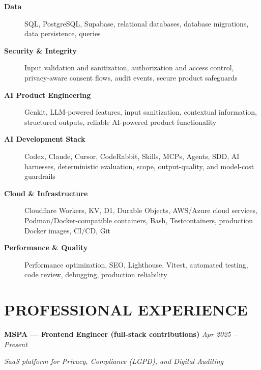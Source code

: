 \documentclass[10pt,a4paper]{article}
\begin{document}
\begin{description}
    \item[\textbf{Data}]
    SQL, PostgreSQL, Supabase, relational databases,
    database migrations, data persistence, queries

    \item[\textbf{Security \& Integrity}]
    Input validation and sanitization, authorization and access control,
    privacy-aware consent flows, audit events, secure product safeguards

    \item[\textbf{AI Product Engineering}]
    Genkit, LLM-powered features, input sanitization,
    contextual information, structured outputs,
    reliable AI-powered product functionality

    \item[\textbf{AI Development Stack}]
    Codex, Claude, Cursor, CodeRabbit, Skills,
    MCPs, Agents, SDD, AI harnesses, deterministic evaluation,
    scope, output-quality, and model-cost guardrails

    \item[\textbf{Cloud \& Infrastructure}]
    Cloudflare Workers, KV, D1, Durable Objects,
    AWS/Azure cloud services, Podman/Docker-compatible containers,
    Bash, Testcontainers, production Docker images, CI/CD, Git

    \item[\textbf{Performance \& Quality}]
    Performance optimization, SEO, Lighthouse,
    Vitest, automated testing, code review,
    debugging, production reliability

\end{description}


\section*{PROFESSIONAL EXPERIENCE}

\noindent
\textbf{MSPA — Frontend Engineer (full-stack contributions)}
\hfill
\textit{Apr 2025 -- Present}

\textit{SaaS platform for Privacy, Compliance (LGPD), and Digital Auditing}
\end{document}
